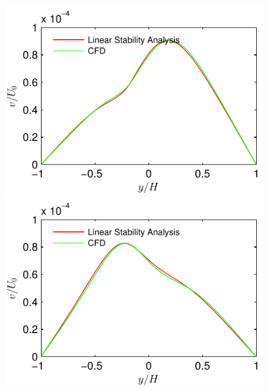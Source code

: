 \documentclass[12pt]{report}   %
\begin{document}
\begin{figure}
\centerline{\includegraphics{LinearStabilityVsCFD_v_phase0} \includegraphics{LinearStabilityVsCFD_v_phase90}}

\end{figure}
\end{document}
